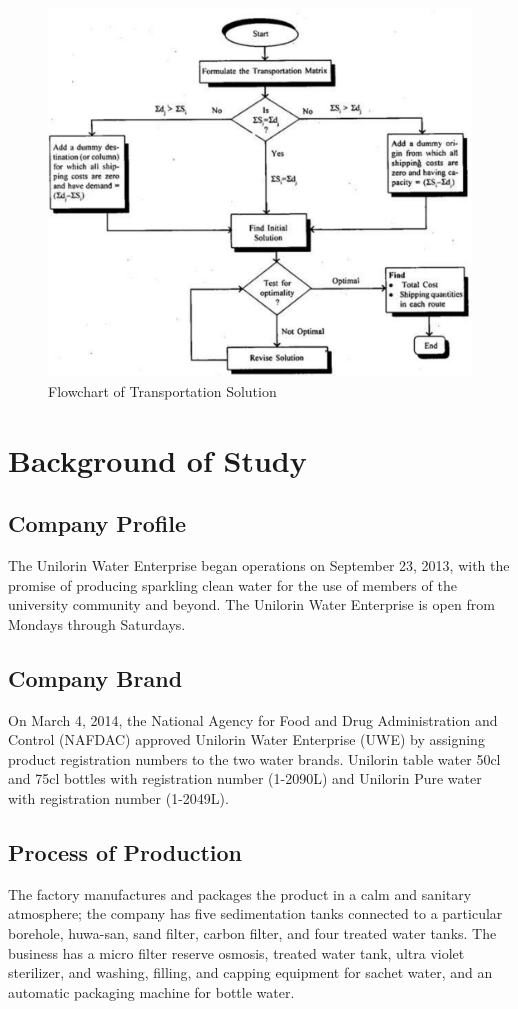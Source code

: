 \documentclass[12pt]{report}
\begin{document}
	\begin{figure}[!h]
		\centering
		\includegraphics[width=0.7\linewidth]{tt5}
		\caption{Flowchart of Transportation Solution}
		\label{fg:3_3}
	\end{figure}

	\section{Background of Study}
	\subsection{Company Profile}
	The Unilorin Water Enterprise began operations on September 23, 2013, with the promise of producing sparkling clean water for the use of members of the university community and beyond. The Unilorin Water Enterprise is open from Mondays through Saturdays.
	
	\subsection{Company Brand}
	On March 4, 2014, the National Agency for Food and Drug Administration and Control (NAFDAC) approved Unilorin Water Enterprise (UWE) by assigning product registration numbers to the two water brands. Unilorin table water 50cl and 75cl bottles with registration number (1-2090L) and Unilorin Pure water with registration number (1-2049L).
	
	\subsection{Process of Production}
	The factory manufactures and packages the product in a calm and sanitary atmosphere; the company has five sedimentation tanks connected to a particular borehole, huwa-san, sand filter, carbon filter, and four treated water tanks. The business has a micro filter reserve osmosis, treated water tank, ultra violet sterilizer, and washing, filling, and capping equipment for sachet water, and an automatic packaging machine for bottle water.
	
\end{document}
